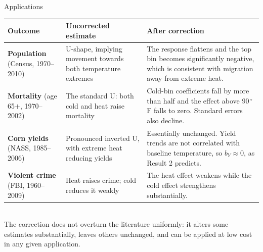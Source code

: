 \documentclass[aspectratio=169,10pt]{beamer}
\begin{document}
\begin{frame}{Applications}
  \centering
  \footnotesize
  \begin{tabular}{@{}L{0.18\textwidth}L{0.30\textwidth}L{0.42\textwidth}@{}}
    \toprule
    \textbf{Outcome} & \textbf{Uncorrected estimate} & \textbf{After correction} \\
    \midrule
    \textbf{Population} \newline (Census, 1970--2010)
      & U-shape, implying movement towards both temperature extremes
      & The response flattens and the top bin becomes significantly negative, which is
        consistent with migration away from extreme heat. \\[3pt]
    \textbf{Mortality} \newline (age 65$+$, 1970--2002)
      & The standard U: both cold and heat raise mortality
      & Cold-bin coefficients fall by more than half and the effect above
        $90\,^\circ$F falls to zero. Standard errors also decline. \\[3pt]
    \textbf{Corn yields} \newline (NASS, 1985--2006)
      & Pronounced inverted U, with extreme heat reducing yields
      & Essentially unchanged. Yield trends are not correlated with baseline
        temperature, so $b_Y \approx 0$, as Result 2 predicts. \\[3pt]
    \textbf{Violent crime} \newline (FBI, 1960--2009)
      & Heat raises crime; cold reduces it weakly
      & The heat effect weakens while the cold effect strengthens substantially. \\
    \bottomrule
  \end{tabular}
  \vspace{3pt}
  \\ \small The correction does not overturn the literature uniformly: it alters some
  estimates substantially, leaves others unchanged, and can be applied at low cost in
  any given application.
\end{frame}
\end{document}
